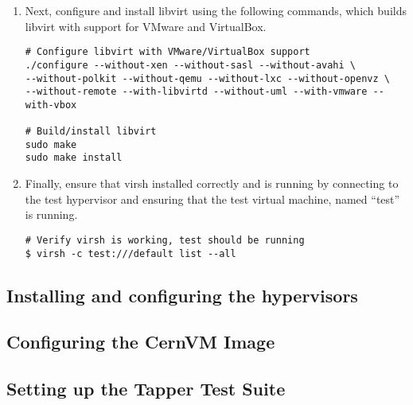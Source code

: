 \begin{enumerate}
\item	Next, configure and install libvirt using the following commands, which builds libvirt with support for VMware and
		VirtualBox.

\lstset{language=bash,caption=Configure and Install libvirt}
\begin{lstlisting}
# Configure libvirt with VMware/VirtualBox support
./configure --without-xen --without-sasl --without-avahi \
--without-polkit --without-qemu --without-lxc --without-openvz \
--without-remote --with-libvirtd --without-uml --with-vmware --with-vbox

# Build/install libvirt
sudo make
sudo make install
\end{lstlisting}	

\item 	Finally, ensure that virsh installed correctly and is running by connecting to the test hypervisor and ensuring 
		that the test virtual machine, named ``test'' is running.

\lstset{language=bash,caption=Verify virsh was Installed Properly}
\begin{lstlisting}
# Verify virsh is working, test should be running
$ virsh -c test:///default list --all
\end{lstlisting}
\end{enumerate}




\newpage
\subsection{Installing and configuring the hypervisors}
\subsection{Configuring the CernVM Image}
\subsection{Setting up the Tapper Test Suite}